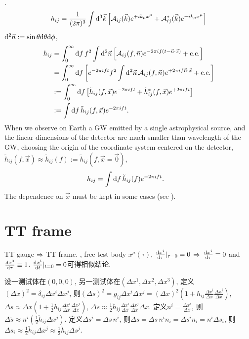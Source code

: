 \def\A{\mathcal{A}}
\cite{Maggiore2014}. 
\begin{equation}
    h_{ij}=\frac{1}{(2\pi)^3}\int\d^3\vec{k}\left[\A_{ij}(\vec{k})e^{+ik_\mu x^\mu}+\A_{ij}^*(\vec{k})e^{-ik_\mu x^\mu}\right]
\end{equation}
$\mathrm{d}^2\vec{n}:=\sin\theta\mathrm{d}\theta\mathrm{d}\phi$,
\begin{align}
    h_{ij}&=\int_0^\infty\d f\, f^2\int\d^2\vec{n}\left[\A_{ij}(f,\vec{n})e^{-2\pi i f(t-\vec{n}\cdot\vec{x})}+\t{c.c.}\right]\\
    &=\int_0^\infty\d f\left[e^{-2\pi i ft}f^2\int\d^2\vec{n}\,\A_{ij}(f,\vec{n})e^{+2\pi i f\vec{n}\cdot\vec{x}}+\t{c.c.}\right]\\
    &:=\int_0^\infty\d f\left[\tilde{h}_{ij}(f,\vec{x})e^{-2\pi i ft}+\tilde{h}_{ij}^*(f,\vec{x})e^{+2\pi i ft}\right]\\
    &:=\int\d f\,\tilde{h}_{ij}(f,\vec{x})e^{-2\pi i ft}.
\end{align}
When we observe on Earth a GW emitted by a single astrophysical source, and the linear dimensions of the detector are much smaller than wavelength of the GW, choosing the origin of the coordinate system centered on the detector, $\tilde{h}_{ij}(f,\vec{x})\approx\tilde{h}_{ij}(f):=\tilde{h}_{ij}(f,\vec{x}=\vec{0})$,
\begin{align}
    h_{ij}&=\int\mathrm{d} f\,\tilde{h}_{ij}(f)e^{-2\pi i ft}.
\end{align}
The dependence on $\vec{x}$ must be kept in some cases (see \cite{Maggiore2014}).

\section{TT frame}

TT gauge $\Rightarrow$ TT frame. \cite{Maggiore2014}, free test body $x^\mu(\tau)$, $\frac{\mathrm{d} x^i}{\mathrm{d} \tau}|_{\tau=0}=0$ $\Rightarrow$ $\frac{\mathrm{d} x^i}{\mathrm{d} \tau}\equiv0$ and $\frac{\mathrm{d} x^0}{\mathrm{d} \tau}\equiv1$. $\frac{\mathrm{d} x^i}{\mathrm{d} t}|_{t=0}=0$可得相似结论.

设一测试体在$(0,0,0)$, 另一测试体在$(\Delta x^1,\Delta x^2,\Delta x^3)$, 定义$(\Delta x)^2=\delta_{ij}\Delta x^i\Delta x^j$, 则$(\Delta s)^2=g_{ij}\Delta x^i\Delta x^j=(\Delta x)^2(1+h_{ij}\frac{\Delta x^i}{\Delta x}\frac{\Delta x^j}{\Delta x})$, $\Delta s\approx\Delta x(1+\frac{1}{2}h_{ij}\frac{\Delta x^i}{\Delta x}\frac{\Delta x^j}{\Delta x})$, $\Delta \ddot{s}\approx\frac{1}{2}\ddot{h}_{ij}\frac{\Delta x^i}{\Delta x}\frac{\Delta x^j}{\Delta x}\Delta x$. 定义$n^i=\frac{\Delta x^i}{\Delta x}$, 则$\Delta \ddot{s}\approx n^i(\frac{1}{2}\ddot{h}_{ij}\Delta x^j)$. 定义$\Delta s^i=\Delta s\,n^i$, 则$\Delta s=\Delta s\,n^in_i=\Delta s^in_i=n^i\Delta s_i$, 则$\Delta s_i\approx \frac{1}{2}\ddot{h}_{ij}\Delta x^j\approx\frac{1}{2}\ddot{h}_{ij}\Delta s^j$.

